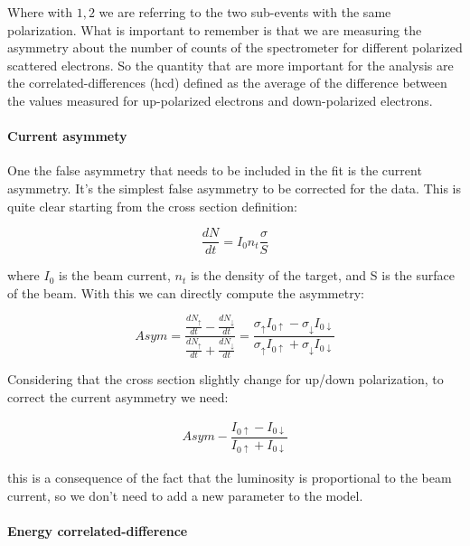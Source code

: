 \documentclass[10pt,a4paper]{article}
\begin{document}
Where with $1,2$ we are referring to the two sub-events with the same polarization.
What is important to remember is that we are measuring the asymmetry about the number of counts of the spectrometer for different polarized scattered electrons. So the quantity that are more important for the analysis are the correlated-differences (hcd) defined as the average of the difference between the values measured for up-polarized electrons and down-polarized electrons. 

\paragraph{Current asymmety}

One the false asymmetry that needs to be included in the fit is the current asymmetry. It's the simplest false asymmetry to be corrected for the data. This is quite clear starting from the cross section definition:

\begin{equation}
\frac{dN}{dt} = I_{0} n_{t} \frac{\sigma}{S}
\end{equation}

where $I_{0}$ is the beam current, $n_{t}$ is the density of the target, and S is the surface of the beam. With this we can directly compute the asymmetry:

\begin{equation}
Asym = \dfrac{\frac{dN_{\uparrow}}{dt} - \frac{dN_{\downarrow}}{dt}}{\frac{dN_{\uparrow}}{dt} + \frac{dN_{\downarrow}}{dt}} = \dfrac{\sigma_{\uparrow} I_{0 \uparrow} - \sigma_{\downarrow} I_{0 \downarrow}}{\sigma_{\uparrow} I_{0 \uparrow} + \sigma_{\downarrow} I_{0 \downarrow}}
\end{equation}

Considering that the cross section slightly change for up/down polarization, to correct the current asymmetry we need:

\begin{align*}
Asym - \dfrac{I_{0 \uparrow} - I_{0 \downarrow}}{I_{0 \uparrow} + I_{0 \downarrow}}
\end{align*}

this is a consequence of the fact that the luminosity is proportional to the beam current, so we don't need to add a new parameter to the model.

\paragraph{Energy correlated-difference}
\end{document}

